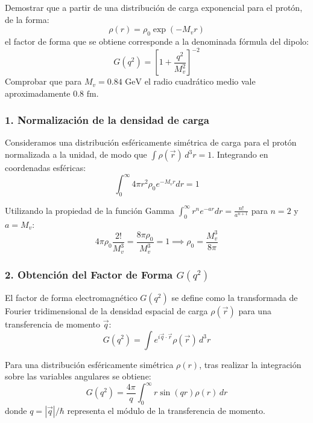 \newpage
\begin{problema}
Demostrar que a partir de una distribución de carga exponencial para el protón, de la forma:
\begin{equation}
\rho(r) = \rho_0 \exp(-M_v r)
\end{equation}
el factor de forma que se obtiene corresponde a la denominada fórmula del dipolo:
\begin{equation}
G(q^2) = \left[ 1 + \frac{q^2}{M_v^2} \right]^{-2}
\end{equation}
Comprobar que para $M_v = 0.84\text{ GeV}$ el radio cuadrático medio vale aproximadamente $0.8\text{ fm}$.

\tcblower

\subsubsection*{1. Normalización de la densidad de carga}

Consideramos una distribución esféricamente simétrica de carga para el protón normalizada a la unidad, de modo que $\int \rho(\vec{r}) \, d^3r = 1$. Integrando en coordenadas esféricas:
\begin{equation}
\int_0^\infty 4\pi r^2 \rho_0 e^{-M_v r} dr = 1
\end{equation}

Utilizando la propiedad de la función Gamma $\int_0^\infty r^n e^{-a r} dr = \frac{n!}{a^{n+1}}$ para $n=2$ y $a=M_v$:
\begin{equation}
4\pi \rho_0 \frac{2!}{M_v^3} = \frac{8\pi \rho_0}{M_v^3} = 1 \implies \rho_0 = \frac{M_v^3}{8\pi}
\end{equation}

\subsubsection*{2. Obtención del Factor de Forma $G(q^2)$}

El factor de forma electromagnético $G(q^2)$ se define como la transformada de Fourier tridimensional de la densidad espacial de carga $\rho(\vec{r})$ para una transferencia de momento $\vec{q}$:
\begin{equation}
G(q^2) = \int e^{i \vec{q} \cdot \vec{r}} \rho(\vec{r}) \, d^3r
\end{equation}

Para una distribución esféricamente simétrica $\rho(r)$, tras realizar la integración sobre las variables angulares se obtiene:
\begin{equation}
G(q^2) = \frac{4\pi}{q} \int_0^\infty r \sin(qr) \rho(r) \, dr
\end{equation}
donde $q = |\vec{q}|/\hbar$ representa el módulo de la transferencia de momento.


\end{problema}
